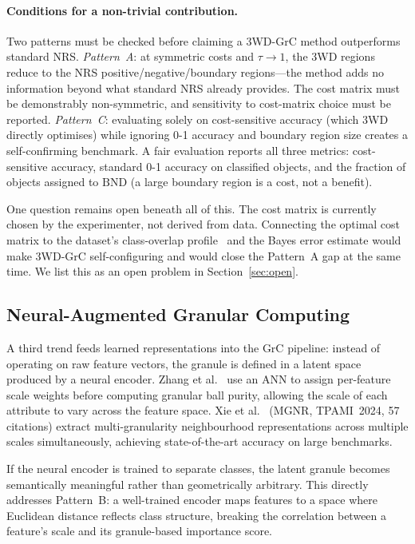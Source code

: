 \paragraph{Conditions for a non-trivial contribution.}
Two patterns must be checked before claiming a 3WD-GrC method outperforms
standard NRS.
\emph{Pattern~A}: at symmetric costs and $\tau \to 1$, the 3WD regions reduce
to the NRS positive/negative/boundary regions---the method adds no information
beyond what standard NRS already provides.  The cost matrix must be
demonstrably non-symmetric, and sensitivity to cost-matrix choice must be
reported.
\emph{Pattern~C}: evaluating solely on cost-sensitive accuracy (which 3WD
directly optimises) while ignoring 0-1 accuracy and boundary region size
creates a self-confirming benchmark.  A fair evaluation reports all three
metrics: cost-sensitive accuracy, standard 0-1 accuracy on classified objects,
and the fraction of objects assigned to $\mathrm{BND}$ (a large boundary
region is a cost, not a benefit).

One question remains open beneath all of this.
The cost matrix is currently chosen by the experimenter, not derived from
data.  Connecting the optimal cost matrix to the dataset's class-overlap
profile~\cite{Santos2022overlap} and the Bayes error estimate would make
3WD-GrC self-configuring and would close the Pattern~A gap at the same time.
We list this as an open problem in Section~\ref{sec:open}.

\subsection{Neural-Augmented Granular Computing}
\label{sec:trend_neural}

A third trend feeds learned representations into the GrC pipeline: instead
of operating on raw feature vectors, the granule is defined in a latent
space produced by a neural encoder.
Zhang et al.~\cite{Zhang2025NN} use an ANN to assign per-feature scale
weights before computing granular ball purity, allowing the scale of each
attribute to vary across the feature space.
Xie et al.~\cite{Xie2024TPAMI} (MGNR, TPAMI~2024, 57 citations) extract
multi-granularity neighbourhood representations across multiple scales
simultaneously, achieving state-of-the-art accuracy on large benchmarks.

If the neural encoder is trained to separate classes, the latent granule
becomes semantically meaningful rather than geometrically arbitrary.  This
directly addresses Pattern~B: a well-trained encoder maps features to a space
where Euclidean distance reflects class structure, breaking the correlation
between a feature's scale and its granule-based importance score.


